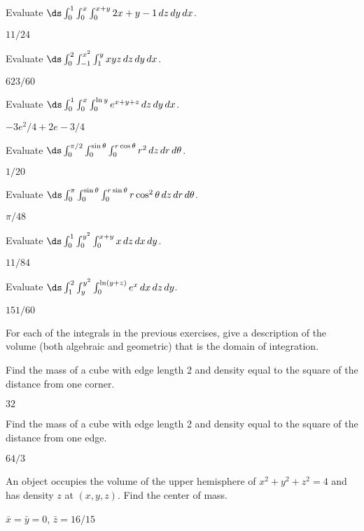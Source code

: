 \begin{exercises}

\exercise Evaluate $\ds\int_{0}^{1}\int_{0}^{x}\int_{0}^{x+y}
2x+y-1 \,dz\,dy\,dx$.
\begin{answer} $11/24$
\end{answer}

\exercise Evaluate $\ds\int_{0}^{2}\int_{-1}^{x^2}\int_{1}^{y}
xyz \,dz\,dy\,dx$.
\begin{answer} $623/60$
\end{answer}

\exercise Evaluate $\ds\int_{0}^{1}\int_{0}^{x}\int_{0}^{\ln y}
e^{x+y+z}\,dz\,dy\,dx$.
\begin{answer} $-3e^2/4+2e-3/4$
\end{answer}

\exercise Evaluate
$\ds\int_{0}^{\pi/2}\int_{0}^{\sin\theta}\int_{0}^{r\cos\theta}
r^2\,dz\,dr\,d\theta$.
\begin{answer} $1/20$
\end{answer}

\exercise Evaluate 
$\ds\int_{0}^{\pi}\int_{0}^{\sin\theta}\int_{0}^{r\sin\theta}
r\cos^2\theta\,dz\,dr\,d\theta$.
\begin{answer} $\pi/48$
\end{answer}

\exercise Evaluate $\ds\int_{0}^{1}\int_{0}^{y^2}\int_{0}^{x+y}
x\,dz\,dx\,dy$.
\begin{answer} $11/84$
\end{answer}

\exercise Evaluate $\ds\int_{1}^{2}\int_{y}^{y^2}\int_{0}^{\ln(y+z)}
e^x\,dx\,dz\,dy$.
\begin{answer} $151/60$
\end{answer}

\exercise For each of the integrals in the previous exercises, give a
description of the volume (both algebraic and geometric) that is the
domain of integration.


\exercise Find the mass of a cube with edge length 2 and density equal
to the square of the distance from one corner.
\begin{answer} $32$
\end{answer}

\exercise Find the mass of a cube with edge length 2 and density equal
to the square of the distance from one edge.
\begin{answer} $64/3$
\end{answer}

\exercise An object occupies the volume of the upper hemisphere of 
$x^2+y^2+z^2=4$ and has density $z$ at $(x,y,z)$. Find the center of mass.
\begin{answer} $\bar x=\bar y=0$, $\bar z=16/15$
\end{answer}


\end{exercises}
